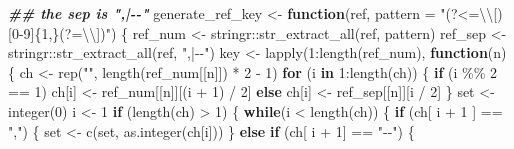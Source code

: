 \documentclass[
]{article}
\newenvironment{Shaded}{\begin{snugshade}}{\end{snugshade}}
\newcommand{\AttributeTok}[1]{\textcolor[rgb]{0.77,0.63,0.00}{#1}}
\newcommand{\ControlFlowTok}[1]{\textcolor[rgb]{0.13,0.29,0.53}{\textbf{#1}}}
\newcommand{\DecValTok}[1]{\textcolor[rgb]{0.00,0.00,0.81}{#1}}
\newcommand{\DocumentationTok}[1]{\textcolor[rgb]{0.56,0.35,0.01}{\textbf{\textit{#1}}}}
\newcommand{\FunctionTok}[1]{\textcolor[rgb]{0.00,0.00,0.00}{#1}}
\newcommand{\NormalTok}[1]{#1}
\newcommand{\OtherTok}[1]{\textcolor[rgb]{0.56,0.35,0.01}{#1}}
\newcommand{\SpecialCharTok}[1]{\textcolor[rgb]{0.00,0.00,0.00}{#1}}
\newcommand{\StringTok}[1]{\textcolor[rgb]{0.31,0.60,0.02}{#1}}
\begin{document}
\begin{Shaded}
\begin{Highlighting}[]
\DocumentationTok{\#\# the sep is ",|{-}{-}"}
\NormalTok{generate\_ref\_key }\OtherTok{\textless{}{-}} \ControlFlowTok{function}\NormalTok{(ref, }\AttributeTok{pattern =} \StringTok{"(?\textless{}=}\SpecialCharTok{\textbackslash{}\textbackslash{}}\StringTok{[)[0{-}9]\{1,\}(?=}\SpecialCharTok{\textbackslash{}\textbackslash{}}\StringTok{])"}\NormalTok{) \{}
\NormalTok{  ref\_num }\OtherTok{\textless{}{-}}\NormalTok{ stringr}\SpecialCharTok{::}\FunctionTok{str\_extract\_all}\NormalTok{(ref, pattern)}
\NormalTok{  ref\_sep }\OtherTok{\textless{}{-}}\NormalTok{ stringr}\SpecialCharTok{::}\FunctionTok{str\_extract\_all}\NormalTok{(ref, }\StringTok{",|{-}{-}"}\NormalTok{)}
\NormalTok{  key }\OtherTok{\textless{}{-}} \FunctionTok{lapply}\NormalTok{(}\DecValTok{1}\SpecialCharTok{:}\FunctionTok{length}\NormalTok{(ref\_num),}
    \ControlFlowTok{function}\NormalTok{(n) \{}
\NormalTok{      ch }\OtherTok{\textless{}{-}} \FunctionTok{rep}\NormalTok{(}\StringTok{""}\NormalTok{, }\FunctionTok{length}\NormalTok{(ref\_num[[n]]) }\SpecialCharTok{*} \DecValTok{2} \SpecialCharTok{{-}} \DecValTok{1}\NormalTok{)}
      \ControlFlowTok{for}\NormalTok{ (i }\ControlFlowTok{in} \DecValTok{1}\SpecialCharTok{:}\FunctionTok{length}\NormalTok{(ch)) \{}
        \ControlFlowTok{if}\NormalTok{ (i }\SpecialCharTok{\%\%} \DecValTok{2} \SpecialCharTok{==} \DecValTok{1}\NormalTok{)}
\NormalTok{          ch[i] }\OtherTok{\textless{}{-}}\NormalTok{ ref\_num[[n]][(i }\SpecialCharTok{+} \DecValTok{1}\NormalTok{) }\SpecialCharTok{/} \DecValTok{2}\NormalTok{]}
        \ControlFlowTok{else}
\NormalTok{          ch[i] }\OtherTok{\textless{}{-}}\NormalTok{ ref\_sep[[n]][i }\SpecialCharTok{/} \DecValTok{2}\NormalTok{]}
\NormalTok{      \}}
\NormalTok{      set }\OtherTok{\textless{}{-}} \FunctionTok{integer}\NormalTok{(}\DecValTok{0}\NormalTok{)}
\NormalTok{      i }\OtherTok{\textless{}{-}} \DecValTok{1}
      \ControlFlowTok{if}\NormalTok{ (}\FunctionTok{length}\NormalTok{(ch) }\SpecialCharTok{\textgreater{}} \DecValTok{1}\NormalTok{) \{}
        \ControlFlowTok{while}\NormalTok{(i }\SpecialCharTok{\textless{}} \FunctionTok{length}\NormalTok{(ch)) \{}
          \ControlFlowTok{if}\NormalTok{ (ch[ i }\SpecialCharTok{+} \DecValTok{1}\NormalTok{ ] }\SpecialCharTok{==} \StringTok{","}\NormalTok{) \{}
\NormalTok{            set }\OtherTok{\textless{}{-}} \FunctionTok{c}\NormalTok{(set, }\FunctionTok{as.integer}\NormalTok{(ch[i]))}
\NormalTok{          \} }\ControlFlowTok{else} \ControlFlowTok{if}\NormalTok{ (ch[ i }\SpecialCharTok{+} \DecValTok{1}\NormalTok{] }\SpecialCharTok{==} \StringTok{"{-}{-}"}\NormalTok{) \{}

\end{Highlighting}
\end{Shaded}
\end{document}

